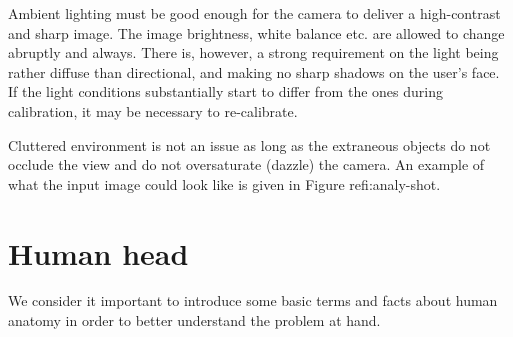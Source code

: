 Ambient lighting must be good enough for the camera to deliver a high-contrast and sharp image.
The image brightness, white balance etc. are allowed to change abruptly and always.
There is, however, a strong requirement on the light being rather diffuse than directional, and making no sharp shadows on the user's face.
If the light conditions substantially start to differ from the ones during calibration, it may be necessary to re-calibrate.

Cluttered environment is not an issue as long as the extraneous objects do not occlude the view and do not oversaturate (dazzle) the camera.
An example of what the input image could look like is given in Figure ref{i:analy-shot}.

\section{Human head}

We consider it important to introduce some basic terms and facts about human anatomy in order to better understand the problem at hand.

